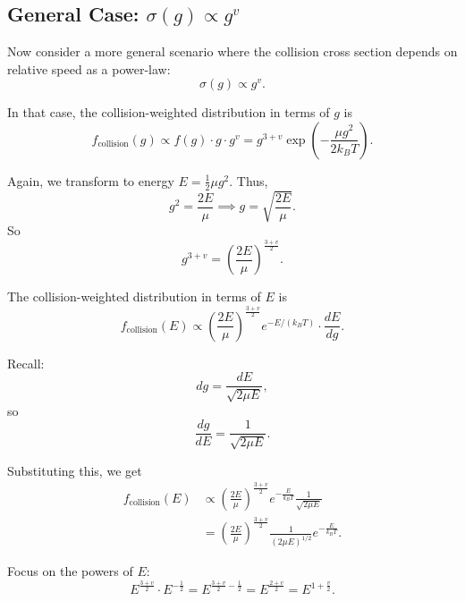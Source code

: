 \subsection{General Case: $\sigma(g) \propto g^{v}$}

Now consider a more general scenario where the collision cross section depends on relative speed as a power-law:
\begin{equation}
  \sigma(g) \propto g^{v}.
\end{equation}

In that case, the collision-weighted distribution in terms of $g$ is
\begin{equation}
  f_{\text{collision}}(g) \propto f(g) \cdot g \cdot g^{v} = g^{3+v} \exp\left(-\frac{\mu g^{2}}{2 k_B T}\right).
\end{equation}

Again, we transform to energy $E = \tfrac{1}{2}\mu g^{2}$. Thus,
\begin{equation}
  g^{2} = \frac{2E}{\mu} \implies g = \sqrt{\frac{2E}{\mu}}.
\end{equation}
So
\begin{equation}
  g^{3+v} = \left(\frac{2E}{\mu}\right)^{\frac{3+v}{2}}.
\end{equation}

The collision-weighted distribution in terms of $E$ is
\begin{equation}
  f_{\text{collision}}(E) \propto \left(\frac{2E}{\mu}\right)^{\frac{3+v}{2}} e^{-E/(k_B T)} \cdot \frac{dE}{dg}.
\end{equation}

Recall:
\begin{equation}
  dg = \frac{dE}{\sqrt{2\mu E}},
\end{equation}
so
\begin{equation}
  \frac{dg}{dE} = \frac{1}{\sqrt{2\mu E}}.
\end{equation}

Substituting this, we get
\begin{align}
  f_{\text{collision}}(E) &\propto \left(\frac{2E}{\mu}\right)^{\frac{3+v}{2}} e^{-\frac{E}{k_B T}} \frac{1}{\sqrt{2\mu E}} \\
  &= \left(\frac{2E}{\mu}\right)^{\frac{3+v}{2}} \frac{1}{(2\mu E)^{1/2}} e^{-\frac{E}{k_B T}}.
\end{align}

Focus on the powers of $E$:
\begin{equation}
  E^{\frac{3+v}{2}} \cdot E^{-\frac{1}{2}} = E^{\frac{3+v}{2} - \frac{1}{2}} = E^{\frac{2+v}{2}} = E^{1 + \frac{v}{2}}.
\end{equation}

